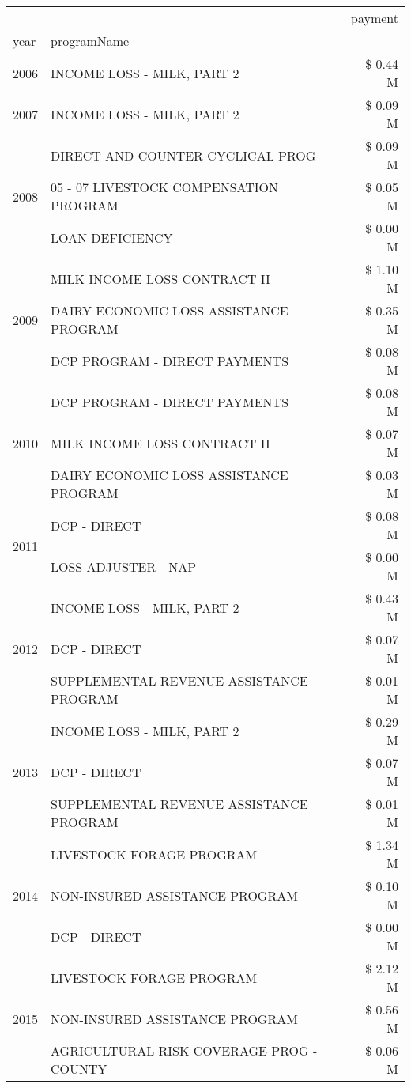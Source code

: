 \begin{tabular}{llr}
\toprule
 &  & payment \\
year & programName &  \\
\midrule
2006 & INCOME LOSS - MILK, PART 2 & \$ 0.44 M \\
\cline{1-3}
2007 & INCOME LOSS - MILK, PART 2 & \$ 0.09 M \\
\cline{1-3}
\multirow[t]{3}{*}{2008} & DIRECT AND COUNTER CYCLICAL PROG & \$ 0.09 M \\
 & 05 - 07 LIVESTOCK COMPENSATION PROGRAM & \$ 0.05 M \\
 & LOAN DEFICIENCY & \$ 0.00 M \\
\cline{1-3}
\multirow[t]{3}{*}{2009} & MILK INCOME LOSS CONTRACT II & \$ 1.10 M \\
 & DAIRY ECONOMIC LOSS ASSISTANCE PROGRAM & \$ 0.35 M \\
 & DCP PROGRAM - DIRECT PAYMENTS & \$ 0.08 M \\
\cline{1-3}
\multirow[t]{3}{*}{2010} & DCP PROGRAM - DIRECT PAYMENTS & \$ 0.08 M \\
 & MILK INCOME LOSS CONTRACT II & \$ 0.07 M \\
 & DAIRY ECONOMIC LOSS ASSISTANCE PROGRAM & \$ 0.03 M \\
\cline{1-3}
\multirow[t]{2}{*}{2011} & DCP - DIRECT & \$ 0.08 M \\
 & LOSS ADJUSTER - NAP & \$ 0.00 M \\
\cline{1-3}
\multirow[t]{3}{*}{2012} & INCOME LOSS - MILK, PART 2 & \$ 0.43 M \\
 & DCP - DIRECT & \$ 0.07 M \\
 & SUPPLEMENTAL REVENUE ASSISTANCE PROGRAM & \$ 0.01 M \\
\cline{1-3}
\multirow[t]{3}{*}{2013} & INCOME LOSS - MILK, PART 2 & \$ 0.29 M \\
 & DCP - DIRECT & \$ 0.07 M \\
 & SUPPLEMENTAL REVENUE ASSISTANCE PROGRAM & \$ 0.01 M \\
\cline{1-3}
\multirow[t]{3}{*}{2014} & LIVESTOCK FORAGE PROGRAM & \$ 1.34 M \\
 & NON-INSURED ASSISTANCE PROGRAM & \$ 0.10 M \\
 & DCP - DIRECT & \$ 0.00 M \\
\cline{1-3}
\multirow[t]{3}{*}{2015} & LIVESTOCK FORAGE PROGRAM & \$ 2.12 M \\
 & NON-INSURED ASSISTANCE PROGRAM & \$ 0.56 M \\
 & AGRICULTURAL RISK COVERAGE PROG - COUNTY & \$ 0.06 M \\

\end{tabular}
